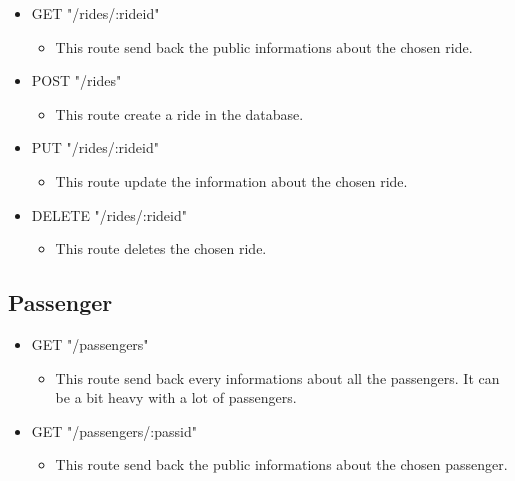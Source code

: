 \begin{itemize}
	\item GET "/rides/:rideid"
	\begin{itemize}
		\item This route send back the public informations about the chosen ride.
	\end{itemize}
\end{itemize}

\begin{itemize}
	\item POST "/rides"
	\begin{itemize}
		\item This route create a ride in the database.
	\end{itemize}
\end{itemize}

\begin{itemize}
	\item PUT "/rides/:rideid"
	\begin{itemize}
		\item This route update the information about the chosen ride.
	\end{itemize}
\end{itemize}

\begin{itemize}
	\item  DELETE "/rides/:rideid"
	\begin{itemize}
		\item This route deletes the chosen ride.
	\end{itemize}
\end{itemize}

\subsection{Passenger}
\begin{itemize}
	\item GET "/passengers"
	\begin{itemize}
		\item This route send back every informations about all the passengers. It can be a bit heavy with a lot of passengers.
	\end{itemize}
\end{itemize}

\begin{itemize}
	\item GET "/passengers/:passid"
	\begin{itemize}
		\item This route send back the public informations about the chosen passenger.

	\end{itemize}
\end{itemize}

